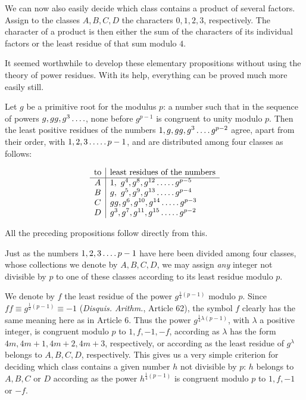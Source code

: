 We can now also easily decide which class contains a product of several factors. Assign to the classes $A,B,C,D$ the characters $0,1,2,3$, respectively. The character of a product is then either the sum of the characters of its individual factors or the least residue of that sum modulo $4$.

It seemed worthwhile to develop these elementary propositions without using the theory of power residues. With its help, everything can be proved much more easily still.

Let $g$ be a primitive root for the modulus $p$: a number such that in the sequence of powers $g,gg,g^3\mathinner{.\,.\,.\,.}$, none before $g^{p-1}$ is congruent to unity modulo $p$. Then the least positive residues of the numbers $1,g,gg,g^3\mathinner{.\,.\,.\,.} g^{p-2}$ agree, apart from their order, with $1,2,3\mathinner{.\,.\,.\,.\,.} p-1$, and are distributed among four classes as follows:

%
\[
\begin{array}{c|l}
\text{to}&\text{least residues of the numbers}\\\hline
A&1,\ g^4,g^8,g^{12}\mathinner{.\,.\,.\,.\,.} g^{p-5}\\
B&g,\ g^5,g^9,g^{13}\mathinner{.\,.\,.\,.\,.} g^{p-4}\\
C&gg,g^6,g^{10},g^{14}\mathinner{.\,.\,.\,.\,.} g^{p-3}\\
D&g^3,g^7,g^{11},g^{15}\mathinner{.\,.\,.\,.\,.} g^{p-2}
\end{array}
\]

All the preceding propositions follow directly from this.

Just as the numbers $1,2,3\mathinner{.\,.\,.\,.} p-1$ have here been divided among four classes, whose collections we denote by $A,B,C,D$, we may assign \emph{any} integer not divisible by $p$ to one of these classes according to its least residue modulo $p$.

We denote by $f$ the least residue of the power $g^{\frac14(p-1)}$ modulo $p$. Since $ff\equiv g^{\frac12(p-1)}\equiv-1$ (\emph{Disquis. Arithm.}, Article 62), the symbol $f$ clearly has the same meaning here as in Article 6. Thus the power $g^{\frac14\lambda(p-1)}$, with $\lambda$ a positive integer, is congruent modulo $p$ to $1,f,-1,-f$, according as $\lambda$ has the form $4m,4m+1,4m+2,4m+3$, respectively, or according as the least residue of $g^\lambda$ belongs to $A,B,C,D$, respectively. This gives us a very simple criterion for deciding which class contains a given number $h$ not divisible by $p$: $h$ belongs to $A,B,C$ or $D$ according as the power $h^{\frac14(p-1)}$ is congruent modulo $p$ to $1,f,-1$ or $-f$.


